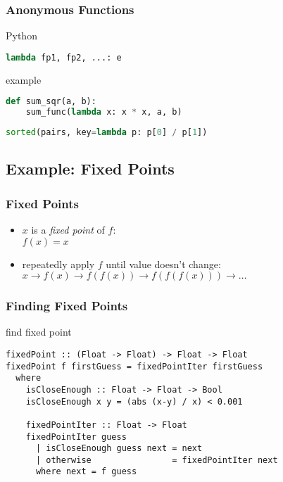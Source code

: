 \documentclass[dvipsnames]{beamer}
\theoremstyle{plain}
\begin{document}
\begin{frame}[fragile]
  \frametitle{Anonymous Functions}

  \begin{block}{Python}
    \begin{lstlisting}[language=python]
      lambda fp1, fp2, ...: e
    \end{lstlisting}
  \end{block}

  \medskip
  \begin{exampleblock}{example}
    \begin{lstlisting}[language=python]
def sum_sqr(a, b):
    sum_func(lambda x: x * x, a, b)
    \end{lstlisting}

    \pause
    \bigskip
    \begin{lstlisting}[language=python]
sorted(pairs, key=lambda p: p[0] / p[1])
    \end{lstlisting}
  \end{exampleblock}
\end{frame}

\subsection{Example: Fixed Points}

\begin{frame}
  \frametitle{Fixed Points}

  \begin{itemize}
    \item $x$ is a \emph{fixed point} of $f$:\\
      $f(x)=x$

    \medskip
    \item repeatedly apply $f$ until value doesn't change:\\
      $x \rightarrow f(x) \rightarrow f(f(x)) \rightarrow f(f(f(x)))
      \rightarrow \ldots$
  \end{itemize}
\end{frame}

\begin{frame}[fragile]
  \frametitle{Finding Fixed Points}

  \begin{exampleblock}{find fixed point}
    \begin{lstlisting}
fixedPoint :: (Float -> Float) -> Float -> Float
fixedPoint f firstGuess = fixedPointIter firstGuess
  where
    isCloseEnough :: Float -> Float -> Bool
    isCloseEnough x y = (abs (x-y) / x) < 0.001

    fixedPointIter :: Float -> Float
    fixedPointIter guess
      | isCloseEnough guess next = next
      | otherwise                = fixedPointIter next
      where next = f guess
    \end{lstlisting}
  \end{exampleblock}
\end{frame}
\end{document}
